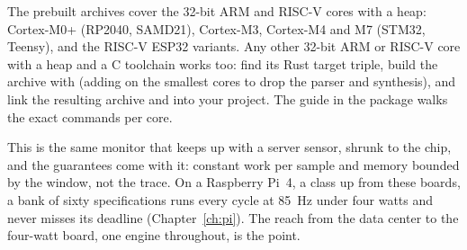 The prebuilt archives cover the 32-bit ARM and RISC-V cores with a heap: Cortex-M0+ (RP2040, SAMD21), Cortex-M3, Cortex-M4 and M7 (STM32, Teensy), and the RISC-V ESP32 variants. Any other 32-bit ARM or RISC-V core with a heap and a C toolchain works too: find its Rust target triple, build the archive with  (adding  on the smallest cores to drop the parser and synthesis), and link the resulting archive and  into your project. The  guide in the package walks the exact commands per core.

\begin{notebox}
This is the same monitor that keeps up with a server sensor, shrunk to the chip, and the guarantees come with it: constant work per sample and memory bounded by the window, not the trace. On a Raspberry Pi~4, a class up from these boards, a bank of sixty specifications runs every cycle at 85~Hz under four watts and never misses its deadline (Chapter~\ref{ch:pi}). The reach from the data center to the four-watt board, one engine throughout, is the point.
\end{notebox}
